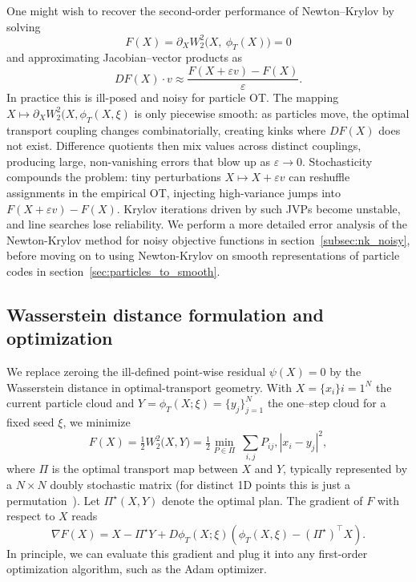 \documentclass{article}
\begin{document}
One might wish to recover the second-order performance of Newton–Krylov by solving
\begin{equation}
F(X)=\partial_X W_2^2\!\big(X,\ \phi_T(X)\big)=0
\end{equation}
and approximating Jacobian–vector products as
\begin{equation}
DF(X)\cdot v \approx  \frac{F(X+\varepsilon v)-F(X)}{\varepsilon}.
\end{equation}
In practice this is ill-posed and noisy for particle OT. The mapping $X\mapsto \partial_X W_2^2(X,\phi_T(X,\xi)$ is only piecewise smooth: as particles move, the optimal transport coupling changes combinatorially, creating kinks where $DF(X)$ does not exist. Difference quotients then mix values across distinct couplings, producing large, non-vanishing errors that blow up as $\varepsilon \to 0$. Stochasticity compounds the problem: tiny perturbations $X \mapsto X+\varepsilon v$ can reshuffle assignments in the empirical OT, injecting high-variance jumps into $F(X+\varepsilon v)-F(X)$. Krylov iterations driven by such JVPs become unstable, and line searches lose reliability. We perform a more detailed error analysis of the Newton-Krylov method for noisy objective functions in section~\ref{subsec:nk_noisy}, before moving on to using Newton-Krylov on smooth representations of particle codes in section~\ref{sec:particles_to_smooth}.

\subsection{Wasserstein distance formulation and optimization} \label{subsec:wasserstein_formulation}
We replace zeroing the ill-defined point-wise residual $\psi(X)=0$ by the Wasserstein distance in optimal-transport geometry. With $X=\{x_i\}{i=1}^N$ the current particle cloud and $Y=\phi_T(X;\xi)=\{y_j\}_{j=1}^N$ the one–step cloud for a fixed seed $\xi$, we minimize
\begin{equation} \label{eq:w2_objective}
F(X) = \tfrac{1}{2} W_2^2\big(X,Y\big)
 = \tfrac{1}{2}\min_{P\in\Pi}\ \sum_{i,j} P_{ij},|x_i-y_j|^2,
\end{equation}
where $\Pi$ is the optimal transport map between $X$ and $Y$, typically represented by a $N\times N$ doubly stochastic matrix (for distinct 1D points this is just a permutation~\cite{}). Let $\Pi^\star(X,Y)$ denote the optimal plan. The gradient of $F$ with respect to $X$ reads
\begin{equation} \label{eq:w2_gradient}
    \nabla F(X) = X - \Pi^\star Y + D\phi_T(X; \xi)\left(\phi_T(X,\xi) - (\Pi^\star)^{\top} X\right).
\end{equation}
In principle, we can evaluate this gradient and plug it into any first-order optimization algorithm, such as the Adam optimizer.
\end{document}

